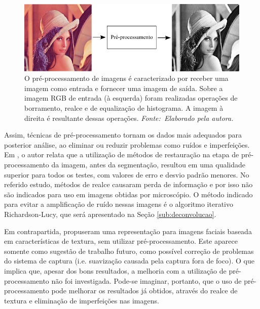 \vspace{12pt}
\begin{figure}[htbp]
 \begin{center}
   \includegraphics[width=1\linewidth]{figuras/preprocessamento.png}
 \caption[Sobre a imagem RGB de entrada foram realizadas operações de borramento, realce e de equalização de histograma. A imagem à direita é resultante dessas operações.]{O pré-processamento de imagens é caracterizado por receber uma imagem como entrada e fornecer uma imagem de saída. Sobre a imagem RGB de entrada (à esquerda) foram realizadas operações de borramento, realce e de equalização de histograma. A imagem à direita é resultante dessas operações. \textit{Fonte:~Elaborado pela autora.}}
 \label{fig:preproc}
 \end{center}
\end{figure}


Assim, técnicas de pré-processamento tornam os dados mais adequados para posterior análise, ao eliminar ou reduzir problemas como ruídos e imperfeições. Em , o autor relata que a utilização de métodos de restauração na etapa de pré-processamento da imagem, antes da segmentação, resultou em uma qualidade superior para todos os testes, com valores de erro e desvio padrão menores. No referido estudo, métodos de realce causaram perda de informação e por isso não são indicados para uso em imagens obtidas por microscópio. O método indicado para evitar a amplificação de ruído nessas imagens é o algoritmo iterativo Richardson-Lucy, que será apresentado na Seção \ref{sub:deconvolucao}.

Em contrapartida,  propuseram uma representação para imagens faciais baseada em características de textura, sem utilizar pré-processamento. Este aparece somente como sugestão de trabalho futuro, como possível correção de problemas do sistema de captura (i.e. suavização causada pela captura fora de foco). O que implica que, apesar dos bons resultados, a melhoria com a utilização de pré-processamento não foi investigada. Pode-se imaginar, portanto, que o uso de pré-processamento pode melhorar os resultados já obtidos, através do realce de textura e eliminação de imperfeições nas imagens.

